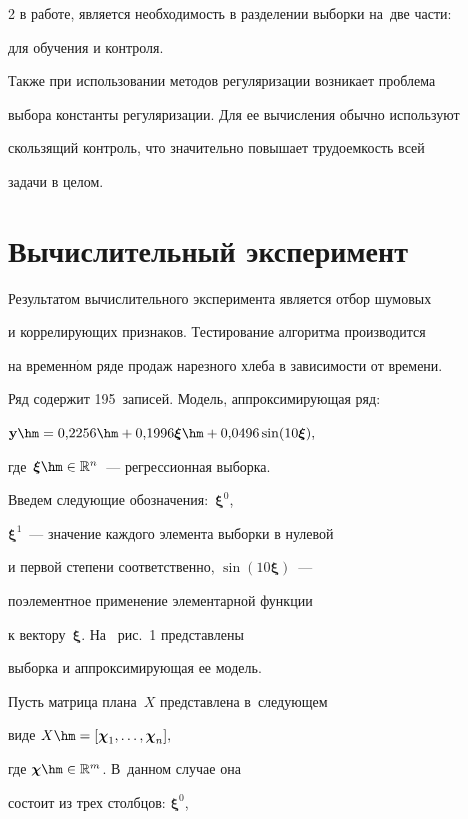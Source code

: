 \begin{multicols}{2}
в работе, является необходимость в разделении выборки на~две части:

для обучения и контроля.



Также при использовании методов регуляризации возникает проблема

выбора константы регуляризации. Для ее вычисления обычно используют

скользящий контроль, что значительно повышает трудоемкость всей

задачи в целом.



\section{Вычислительный эксперимент}



Результатом вычислительного эксперимента является отбор шумовых

и коррелирующих признаков. Тестирование алгоритма производится

на временн$\acute{\mbox{о}}$м ряде продаж нарезного хлеба в зависимости от времени.

Ряд содержит 195~записей. Модель, аппроксимирующая ряд:

$\mathbf{y}\hm=0{,}2256\hm+0{,}1996\boldsymbol{\xi}\hm+0{,}0496\sin(10\boldsymbol{\xi}),$

где~$\boldsymbol{\xi} \hm\in \mathbb{R}^n$~--- регрессионная выборка.

Введем следующие обозначения:~$\boldsymbol{\xi}^0$,

$\boldsymbol{\xi}^1$~--- значение каждого элемента выборки в нулевой

и первой степени соответственно, $\sin(10\boldsymbol{\xi})$~---

поэлементное применение элементарной функции

к вектору~$\boldsymbol{\xi}$. На~ рис.~1 представлены

выборка и аппроксимирующая ее модель.







Пусть матрица плана~$X$ представлена в~сле\-ду\-ющем

виде $X\hm=[\boldsymbol{\chi}_1,\ldots ,\boldsymbol{\chi}_n],$

где $\boldsymbol{\chi}\hm \in \mathbb{R}^m$. В~данном случае она

состоит из трех столбцов: $\boldsymbol{\xi}^0$,


\end{multicols}
